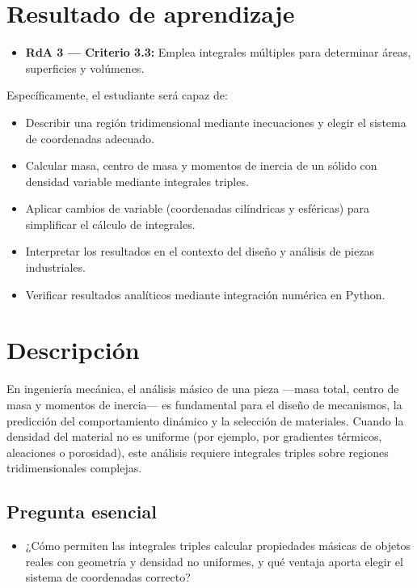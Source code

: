 \documentclass[a4,11pt]{aleph-notas}
\begin{document}
\encabezado

\section{Resultado de aprendizaje}

\begin{itemize}
    \item \textbf{RdA 3 — Criterio 3.3:} Emplea integrales múltiples para determinar áreas, superficies y volúmenes.
\end{itemize}

Específicamente, el estudiante será capaz de:
\begin{itemize}
    \item Describir una región tridimensional mediante inecuaciones y elegir el sistema de coordenadas adecuado.
    \item Calcular masa, centro de masa y momentos de inercia de un sólido con densidad variable mediante integrales triples.
    \item Aplicar cambios de variable (coordenadas cilíndricas y esféricas) para simplificar el cálculo de integrales.
    \item Interpretar los resultados en el contexto del diseño y análisis de piezas industriales.
    \item Verificar resultados analíticos mediante integración numérica en Python.
\end{itemize}


\section{Descripción}

En ingeniería mecánica, el análisis másico de una pieza —masa total, centro de masa y momentos de inercia— es fundamental para el diseño de mecanismos, la predicción del comportamiento dinámico y la selección de materiales. Cuando la densidad del material no es uniforme (por ejemplo, por gradientes térmicos, aleaciones o porosidad), este análisis requiere integrales triples sobre regiones tridimensionales complejas.

\subsection*{Pregunta esencial}
\begin{itemize}[leftmargin=*]
    \item ¿Cómo permiten las integrales triples calcular propiedades másicas de objetos reales con geometría y densidad no uniformes, y qué ventaja aporta elegir el sistema de coordenadas correcto?
\end{itemize}
\end{document}
